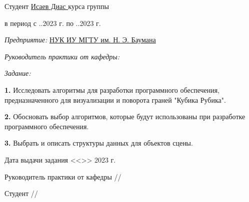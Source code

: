 \fontsize{14pt}{14pt}\selectfont

\noindent Студент \uline{\hfill Исаев Диас \hfill}  курса группы 

\vspace{0.3cm}

\noindent в период с ..2023 г. по ..2023 г.

\vspace{0.3cm}

\noindent \textit{Предприятие:} \uline{\hfill НУК ИУ МГТУ им. Н. Э. Баумана \hfill}

\vspace{0.3cm}






\noindent \textit{Руководитель практики от кафедры:}

\noindent {}

\vspace{0.3cm}

\noindent \textit{Задание:}

\noindent \textbf{1.} Исследовать алгоритмы для разработки программного обеспечения, предназначенного для визуализации и поворота граней "Кубика Рубика".

\noindent \textbf{2.} Обосновать выбор алгоритмов,
которые будут использованы при разработке программного обеспечения.

\noindent \textbf{3.} Выбрать и описать структуры данных для объектов сцены.

\vfill

\noindent Дата выдачи задания <<>> 2023 г.

\vspace{1cm}



\noindent Руководитель практики от кафедры \hfill \ulinetext[2cm]{}{}//

\vspace{0.3cm}

\noindent Студент \hfill \ulinetext[2cm]{}{}//

\vfill

